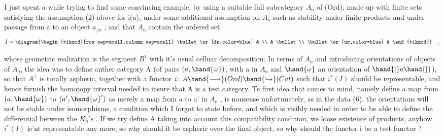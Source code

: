 
I just spent a while trying to find some convincing example,  by
using a suitable full subcategory $A_o$ of (Ord),  made up with finite sets
satisfying the assumption (2) above for i(a),  under some additional
assumption on $A_o$  such as stability under finite products and under 
 passage from a  to an object $a_{/x}$ ,  and that $A_o$  contain
the ordered set
\[ I = \diagram{\begin{tikzcd}[row sep=small,column sep=small] \bullet \ar[dr,color=blue] & \\ & \bullet \\ \bullet \ar[ur,color=blue] & \end{tikzcd}} \quad , \]

whose geometric realization is the segment $B^1$  with it's usual celluar
decomposition.  In terms of $A_o$ and introducing orientations of objects
of $A_o$,  the idea was to define anther category A (of pairs $(a,\hand{\omega})$,
with  a in $A_o$ and $\hand{\omega}$ an orientation of $\hand{|}a\hand{|}$),  \hand{\uline{\textcolor{black}{stable under finite pro-}}}%
\hand{\uline{\textcolor{black}{ducts}}} so that $A^{\wedge}$ is totally aspheric,  together with a functor
$i\colon A \hand{\longrightarrow} (Ord) \hand{\hookrightarrow} (Cat)$  such that $i^{*}(I)$ should be representable,  and
hence furnish the homotopy interval needed to insure that A is a test
category.  Te first idea that comes to mind,  namely define a map
from $(a,\hand{\omega})$  to $(a',\hand{\omega}')$  as merely a map from a to a' in $A_o$ ,  is
nonsense unfortunately,  as in the data (6),  the orientations will not
be stable under isomorphisms,  a condition which I forgot to state
before,  and which is visibly needed in order to be able to define the
differential between the $K_n$'s .  If we try define A taking into account
this compatibility condition,  we loose existence of products,  anyhow
$i^{*}(I)$ is'nt representable any more,  so why should it be aspheric over
the final object,   so why should the functor i be a test functor ?

